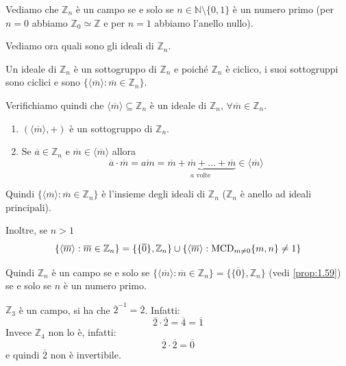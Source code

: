 \documentclass[../main.tex]{subfiles}
\begin{document}
\begin{example}
    Vediamo che $\mathbb{Z}_n$ è un campo se e solo se $n \in \mathbb{N} \setminus \{0,1\}$ è un numero primo (per $n =0 $ abbiamo $\mathbb{Z}_0 \simeq \mathbb{Z} $ e per $n = 1$ abbiamo l'anello nullo).

    Vediamo ora quali sono gli ideali di $\mathbb{Z}_n$.

    Un ideale di $\mathbb{Z}_n $ è un sottogruppo di $\mathbb{Z}_n$ e poiché $\mathbb{Z}_n$ è ciclico, i suoi sottogruppi sono ciclici e sono $\{\langle \overline{m} \rangle : \overline{m} \in \mathbb{Z}_n\}$.

    Verifichiamo quindi che $\langle \overline{m} \rangle \subseteq \mathbb{Z}_n$ è un ideale di $\mathbb{Z}_n$, $\forall \overline{m} \in \mathbb{Z}_n$.

    \begin{enumerate}[label=(\roman*)]
        \item $(\langle \overline{m} \rangle, +)$ è un sottogruppo di $\mathbb{Z}_n$.
        \item Se $\overline{a} \in \mathbb{Z}_n$ e $\overline{m} \in \langle \overline{m} \rangle$ allora
              \[
                  \overline{a} \cdot \overline{m} = \overline{am} = \underbrace{\overline{m} + \overline{m} + \ldots + \overline{m}}_{a \text{ volte }} \in \langle \overline{m} \rangle
              \]
    \end{enumerate}

    Quindi $\{\langle \overline{m} \rangle : \overline{m} \in \mathbb{Z}_n\}$ è l'insieme degli ideali di $\mathbb{Z}_n$ ($\mathbb{Z}_n$ è anello ad ideali principali).

    Inoltre, se $n > 1$
    \[
        \{\langle \overline{m} \rangle : \overline{m} \in \mathbb{Z}_n\} = \{\{\overline{0}\}, \mathbb{Z}_n\} \cup \{\langle \overline{m} \rangle : \operatorname{MCD}_{m \neq 0} \{m,n\} \neq 1\}
    \]

    Quindi $\mathbb{Z}_n$ è un campo se e solo se $\{\langle \overline{m} \rangle : \overline{m} \in \mathbb{Z}_n\} = \{\{\overline{0}\}, \mathbb{Z}_n\}$ (vedi \ref{prop:1.59}) se e solo se $n$ è un numero primo.
\end{example}
\begin{example}
    $\mathbb{Z}_3$ è un campo, si ha che $\overline{2}^{-1} = \overline{2}$. Infatti:
    \begin{equation*}
        \overline{2} \cdot \overline{2} = \overline{4} = \overline{1}
    \end{equation*}
    Invece $\mathbb{Z}_4$ non lo è, infatti:
    \begin{equation*}
        \overline{2} \cdot \overline{2} = \overline{0}
    \end{equation*}
    e quindi $\overline{2}$ non è invertibile.
\end{example}
\end{document}
